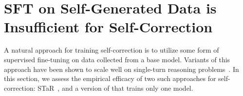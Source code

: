 \vspace{-0.2cm}
\section{SFT on Self-Generated Data is Insufficient for Self-Correction}
\vspace{-0.2cm}
\label{sec:sft}

\begin{table}[t]
\centering
\caption{\footnotesize{\textbf{Self-correction performance after training on $\mathcal{D}_{\mathrm{STaR}}$ and $\mathcal{D}_{\mathrm{SFT}}$.} We find that the gap between the second and first attempts ($\Delta$(t1,t2)) is either negative or small. Both approaches erroneously modify a correct response to be incorrect, i.e., reflected in a high $\Delta^{\mathrm{c} \rightarrow \mathrm{i}}(t1, t2)$ and a low $\Delta^{\mathrm{i} \rightarrow \mathrm{c}}(t1, t2)$.}}
\label{tab:sft_results}
\renewcommand{\arraystretch}{1.25}
\vspace{-0.2cm}
\end{table}

A natural approach for training self-correction is to utilize some form of supervised fine-tuning on data collected from a base model. Variants of this approach have been shown to scale well on single-turn reasoning problems~\citep{singh2023beyond, zelikman2022star}. In this section, we assess the empirical efficacy of two such approaches for self-correction: STaR~\citep{zelikman2022star}, and a version of \citet{welleck2023generating} that trains only one model. %

